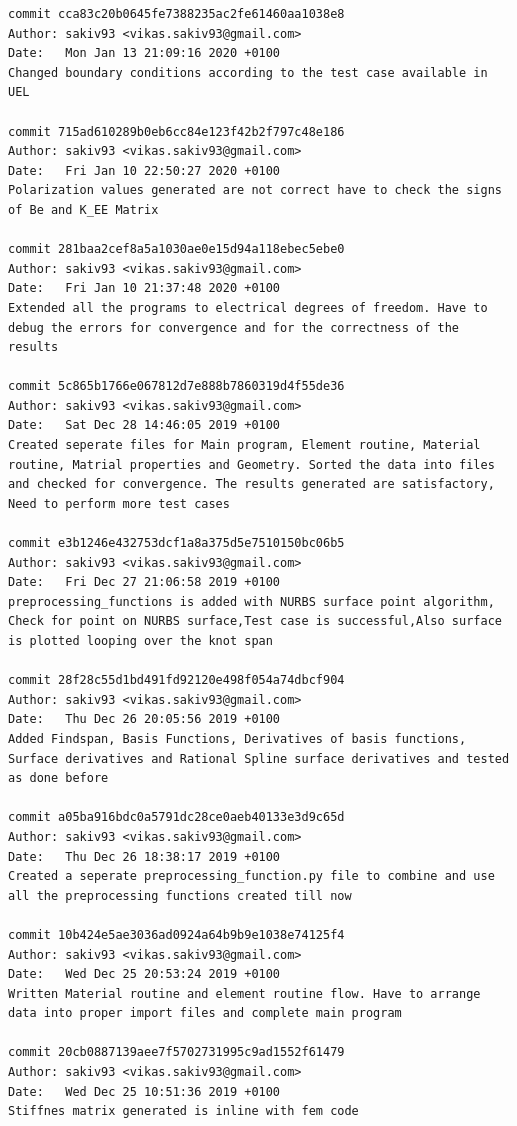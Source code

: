 \documentclass[11pt]{article}
\begin{document}
\begin{Verbatim}[breaklines=true]
commit cca83c20b0645fe7388235ac2fe61460aa1038e8
Author: sakiv93 <vikas.sakiv93@gmail.com>
Date:   Mon Jan 13 21:09:16 2020 +0100
Changed boundary conditions according to the test case available in UEL

commit 715ad610289b0eb6cc84e123f42b2f797c48e186
Author: sakiv93 <vikas.sakiv93@gmail.com>
Date:   Fri Jan 10 22:50:27 2020 +0100
Polarization values generated are not correct have to check the signs of Be and K_EE Matrix

commit 281baa2cef8a5a1030ae0e15d94a118ebec5ebe0
Author: sakiv93 <vikas.sakiv93@gmail.com>
Date:   Fri Jan 10 21:37:48 2020 +0100
Extended all the programs to electrical degrees of freedom. Have to debug the errors for convergence and for the correctness of the results

commit 5c865b1766e067812d7e888b7860319d4f55de36
Author: sakiv93 <vikas.sakiv93@gmail.com>
Date:   Sat Dec 28 14:46:05 2019 +0100
Created seperate files for Main program, Element routine, Material routine, Matrial properties and Geometry. Sorted the data into files and checked for convergence. The results generated are satisfactory, Need to perform more test cases

commit e3b1246e432753dcf1a8a375d5e7510150bc06b5
Author: sakiv93 <vikas.sakiv93@gmail.com>
Date:   Fri Dec 27 21:06:58 2019 +0100
preprocessing_functions is added with NURBS surface point algorithm, Check for point on NURBS surface,Test case is successful,Also surface is plotted looping over the knot span

commit 28f28c55d1bd491fd92120e498f054a74dbcf904
Author: sakiv93 <vikas.sakiv93@gmail.com>
Date:   Thu Dec 26 20:05:56 2019 +0100
Added Findspan, Basis Functions, Derivatives of basis functions, Surface derivatives and Rational Spline surface derivatives and tested as done before

commit a05ba916bdc0a5791dc28ce0aeb40133e3d9c65d
Author: sakiv93 <vikas.sakiv93@gmail.com>
Date:   Thu Dec 26 18:38:17 2019 +0100
Created a seperate preprocessing_function.py file to combine and use all the preprocessing functions created till now

commit 10b424e5ae3036ad0924a64b9b9e1038e74125f4
Author: sakiv93 <vikas.sakiv93@gmail.com>
Date:   Wed Dec 25 20:53:24 2019 +0100
Written Material routine and element routine flow. Have to arrange data into proper import files and complete main program

commit 20cb0887139aee7f5702731995c9ad1552f61479
Author: sakiv93 <vikas.sakiv93@gmail.com>
Date:   Wed Dec 25 10:51:36 2019 +0100
Stiffnes matrix generated is inline with fem code


\end{Verbatim}
\end{document}
